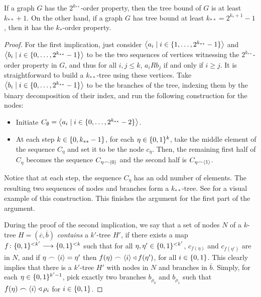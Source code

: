         \begin{theorem} \label{thm:tree_implies_order}
            If a graph $G$ has the $2^{k_{**}}$-order property, then the tree bound of $G$ is at least $k_{**} + 1$.
            On the other hand, if a graph $G$ has tree bound at least $k_{**} = 2^{k_*+1}-1$, then it has the $k_*$-order
            property.
            \begin{proof}
                For the first implication, just consider $\left< a_i \mid i \in \{ 1, \dots, 2^{k_{**}}-1 \} \right>$ and
                $\left< b_i \mid i \in \{ 0, \dots, 2^{k_{**}}-1 \} \right>$ to be the two sequences of vertices witnessing the
                $2^{k_{**}}$-order property in $G$, and thus for all $i,j \leq k$, $a_i R b_j$ if and only if $i \geq j$.
                It is straightforward to build a $k_{**}$-tree using these vertices.
                Take $\left< b_i \mid i \in \{ 0, \dots, 2^{k_{**}}-1 \} \right>$ to be the branches of the tree, indexing them by
                the binary decomposition of their index, and run the following construction for the nodes:
                \begin{itemize}
                    \item Initiate $C_\emptyset = \left< a_i \mid i \in \{ 0, \dots, 2^{k_{**}}-2 \} \right>$.
                    \item At each step $k \in \{ 0, k_{**}-1 \}$, for each $\eta \in \{ 0,1 \}^k$, take the middle
                        element of the sequence $C_\eta$ and set it to be the node $c_\eta$.
                        Then, the remaining first half of $C_\eta$ becomes the sequence $C_{\eta \frown \left< 0 \right>}$
                        and the second half is $C_{\eta \frown \left< 1 \right>}$.
                \end{itemize}
                Notice that at each step, the sequence $C_\eta$ has an odd number of elements.
                The resulting two sequences of nodes and branches form a $k_{**}$-tree.
                See  for a visual example of this construction.
                This finishes the argument for the first part of the argument.

                During the proof of the second implication, we say that a set of nodes $N$ of a $k$-tree
                $H = (\overline{c},\overline{b})$ \emph{contains} a $k'$-tree $H'$, if there exists a map
                $f \colon \{ 0,1 \}^{<k'} \longrightarrow \{ 0,1 \}^{<k}$ such that for all $\eta, \eta' \in \{ 0,1 \}^{<k'}$,
                $c_{f(\eta)}$ and $c_{f(\eta')}$ are in $N$, and if $\eta \frown \left< i \right> = \eta'$ then
                $f(\eta) \frown \left< i \right> \triangleleft f(\eta')$, for all $i \in \{ 0, 1 \}$.
                This clearly implies that there is a $k'$-tree $H'$ with nodes in $N$ and branches in $\overline{b}$.
                Simply, for each $\eta \in \{ 0,1 \}^{k'-1}$, pick exactly two branches $b_{\rho_0}$ and $b_{\rho_1}$ such that
                $f(\eta)\frown\left< i \right> \triangleleft \rho_i$ for $i \in \{ 0,1 \}$.


\end{proof}
\end{theorem}
